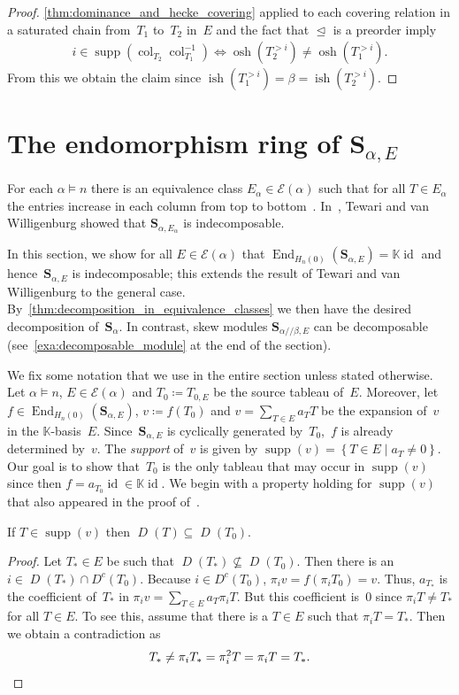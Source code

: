 \documentclass[ALCO,ThmDefs,Unicode,epreuves]{cedram}
\newcommand{\bs}[1]{\boldsymbol{#1} }
\newcommand{\mc}[1]{\mathcal{#1} }
\newcommand{\K}{\mathbb K}
\newcommand{\D}{\operatorname{\mathit{D}}}
\newcommand{\DC}{\operatorname{\mathit{D^c}}}
\DeclareMathOperator{\id}{id}
\DeclareMathOperator{\osh}{osh}
\DeclareMathOperator{\ish}{ish}
\DeclareMathOperator{\supp}{supp}
\DeclareMathOperator{\End}{End}
\newcommand{\set}[1]{\left\{ #1 \right\}}
\newcommand{\col}{\operatorname{col}}
\newcommand{\He}{H_n(0)}
\newcommand{\ab}{{\alpha / \! \! / \beta}}
\newcommand{\dleq}{\trianglelefteq}
\newcommand{\sa}{\bs S_{\alpha}}
\newcommand{\se}{\bs S_{\alpha,E}}
\newcommand{\sse}{\bs S_{\ab,E}}
\begin{document}
\begin{proof}	 
	\cref{thm:dominance_and_hecke_covering} applied to each covering relation in a saturated chain from~$T_1$ to~$T_2$ in~$E$ and the fact that $\dleq$ is a preorder imply 
	\begin{align*}
		i\in \supp(\col_{T_2}\col^{-1}_{T_1}) \iff \osh(T_2^{>i}) \neq \osh(T_1^{>i}).
	\end{align*}
	From this we obtain the claim since $\ish(T^{>i}_1) = \beta = \ish(T^{>i}_2)$.
\end{proof}

\section{The endomorphism ring of \texorpdfstring{$\bs S_{\alpha,E}$}{S\_a,E}}
\label{sec:endomorphism_ring_of_0-Hecke_modules}

 For each $\alpha \vDash n$ there is an equivalence class $E_\alpha\in \mc E(\alpha)$ such that for all $T \in E_\alpha$ the entries increase in each column from top to bottom~\cite[Section~8]{Tewari2015}. 
In~\cite{Tewari2015}, Tewari and van Willigenburg showed that $\bs S_{\alpha,E_\alpha}$ is indecomposable.

In this section, we show for all $E\in \mc E(\alpha)$ that $\End_{\He}(\se) = \K\id$ and hence~$\se$ is indecomposable; this extends the result of Tewari and van Willigenburg to the general case.
By~\cref{thm:decomposition_in_equivalence_classes} we then have the desired decomposition of~$\sa$.
In contrast, skew modules $\sse$ can be decomposable (see~\cref{exa:decomposable_module} at the end of the section).

We fix some notation that we use in the entire section unless stated otherwise.
Let $\alpha\vDash n$, $E\in \mc E(\alpha)$ and $T_0 \coloneqq T_{0,E}$ be the source tableau of~$E$.
Moreover, let $f\in \End_{\He}(\se)$, $v\coloneqq f(T_0)$ and $v = \sum_{T\in E} a_T T$ be the expansion of~$v$ in the $\K$-basis~$E$.
Since~$\se$ is cyclically generated by~$T_0$,~$f$ is already determined by~$v$.
The \emph{support} of~$v$ is given by $\supp(v)=\set{T\in E \mid a_T \neq 0}$.
Our goal is to show that~$T_0$ is the only tableau that may occur in $\supp(v)$ since then $f = a_{T_0} \id \in \K\id$.
We begin with a property holding for $\supp(v)$ that also appeared in the proof of~\cite[Theorem~7.8]{Tewari2015}.

\begin{lemma}
	\label{thm:descent_set_of_support_of_v}
	If $T\in \supp(v)$ then $\D(T) \subseteq \D(T_0)$.
\end{lemma}
\begin{proof} Let $T_*\in E$ be such that $\D(T_*)\not \subseteq \D(T_0)$. 
	Then there is an $i\in \D(T_*)\cap \DC(T_0)$. 
	 Because $i\in \DC(T_0)$, $\pi_i v = f(\pi_i T_0) = v$. Thus, $a_{T_*}$ is the coefficient of~$T_*$ in $\pi_i v = \sum_{T \in E} a_T \pi_i T$. But this coefficient is~$0$ since $\pi_iT \neq T_*$ for all $T\in E$. To see this, assume that there is a $T\in E$ such that $\pi_i T = T_*$. Then we obtain a contradiction as
	 \[
	 T_* \neq \pi_i T_* = \pi_i^2 T = \pi_i T = T_*. \qedhere
	 \]	
\end{proof}
\end{document}
